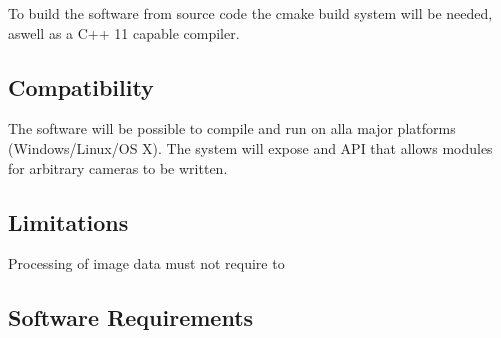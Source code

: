 To build the software from source code the cmake build system will be needed, aswell as a C++ 11 capable compiler.

\subsection{Compatibility}
The software will be possible to compile and run on alla major platforms (Windows/Linux/OS X). The system will expose and API that allows modules for arbitrary cameras to be written.

\subsection{Limitations}
Processing of image data must not require to 

\subsection{Software Requirements}
\label{sec:software_req}
\reqtable
{	
}